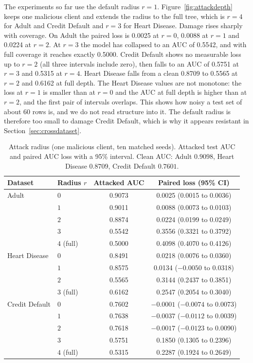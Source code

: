 \documentclass[11pt]{article}
\begin{document}
The experiments so far use the default radius $r=1$. Figure~\ref{fig:attackdepth} keeps one malicious client and extends the radius to the full tree, which is $r=4$ for Adult and Credit Default and $r=3$ for Heart Disease. Damage rises sharply with coverage. On Adult the paired loss is 0.0025 at $r=0$, 0.0088 at $r=1$ and 0.0224 at $r=2$. At $r=3$ the model has collapsed to an AUC of 0.5542, and with full coverage it reaches exactly 0.5000. Credit Default shows no measurable loss up to $r=2$ (all three intervals include zero), then falls to an AUC of 0.5751 at $r=3$ and 0.5315 at $r=4$. Heart Disease falls from a clean 0.8709 to 0.5565 at $r=2$ and 0.6162 at full depth. The Heart Disease values are not monotone: the loss at $r=1$ is smaller than at $r=0$ and the AUC at full depth is higher than at $r=2$, and the first pair of intervals overlaps. This shows how noisy a test set of about 60 rows is, and we do not read structure into it. The default radius is therefore too small to damage Credit Default, which is why it appears resistant in Section~\ref{sec:crossdataset}.

\begin{table}[htbp]
\centering
\caption{Attack radius (one malicious client, ten matched seeds). Attacked test AUC and paired AUC loss with a 95\% interval. Clean AUC: Adult $0.9098$, Heart Disease $0.8709$, Credit Default $0.7601$.}\label{tab:radius}
\begin{tabular}{llcc}
\toprule
Dataset & Radius $r$ & Attacked AUC & Paired loss (95\% CI) \\
\midrule
Adult & $0$ & 0.9073 & 0.0025 (0.0015 to 0.0036) \\
 & $1$ & 0.9011 & 0.0088 (0.0073 to 0.0103) \\
 & $2$ & 0.8874 & 0.0224 (0.0199 to 0.0249) \\
 & $3$ & 0.5542 & 0.3556 (0.3321 to 0.3792) \\
 & $4$ (full) & 0.5000 & 0.4098 (0.4070 to 0.4126) \\
\midrule
Heart Disease & $0$ & 0.8491 & 0.0218 (0.0076 to 0.0360) \\
 & $1$ & 0.8575 & 0.0134 ($-0.0050$ to 0.0318) \\
 & $2$ & 0.5565 & 0.3144 (0.2437 to 0.3851) \\
 & $3$ (full) & 0.6162 & 0.2547 (0.2054 to 0.3040) \\
\midrule
Credit Default & $0$ & 0.7602 & $-0.0001$ ($-0.0074$ to 0.0073) \\
 & $1$ & 0.7638 & $-0.0037$ ($-0.0112$ to 0.0039) \\
 & $2$ & 0.7618 & $-0.0017$ ($-0.0123$ to 0.0090) \\
 & $3$ & 0.5751 & 0.1850 (0.1305 to 0.2396) \\
 & $4$ (full) & 0.5315 & 0.2287 (0.1924 to 0.2649) \\
\bottomrule
\end{tabular}
\end{table}
\end{document}
